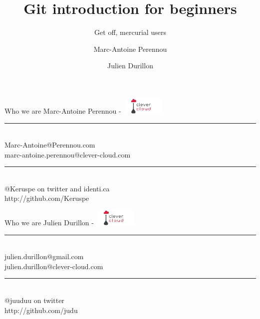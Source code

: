\documentclass{beamer}
\title{Git introduction for beginners}
\subtitle{Get off, mercurial users}
\author[Keruspe \and Judu]{Marc-Antoine Perennou \and Julien Durillon}
\institute[CC]{Clever Cloud -- http://www.clever-cloud.com/}
\date{}
\begin{document}
\begin{frame}[plain]
    \titlepage
\end{frame}

\begin{frame}{Who we are}
      Marc-Antoine Perennou - \includegraphics[width=80px,height=30px]{logo-cc.png} \\[0.5cm]
      \hrule \hfill \\[0.5cm]
      Marc-Antoine@Perennou.com \\
      marc-antoine.perennou@clever-cloud.com \\[0.5cm]
      \hrule \hfill \\[0.5cm]
      @Keruspe on twitter and identi.ca \\
      http://github.com/Keruspe
\end{frame}
\begin{frame}{Who we are}
      Julien Durillon - \includegraphics[width=80px,height=30px]{logo-cc.png} \\[0.5cm]
      \hrule \hfill \\[0.5cm]
      julien.durillon@gmail.com \\
      julien.durillon@clever-cloud.com \\[0.5cm]
      \hrule \hfill \\[0.5cm]
      @juuduu on twitter \\
      http://github.com/judu
\end{frame}
\end{document}
